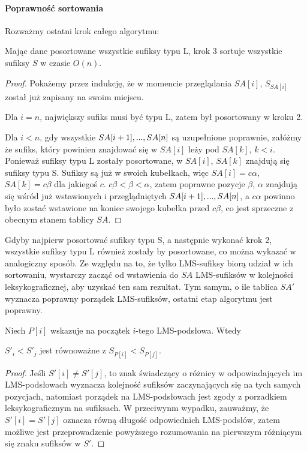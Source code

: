 \paragraph{Poprawność sortowania}

Rozważmy ostatni krok całego algorytmu:

\begin{lemma}{}{}
	Mając dane posortowane wszystkie sufiksy typu L, krok 3 sortuje wszystkie
	sufiksy $S$ w czasie $O(n)$.
\end{lemma}

\begin{proof}
Pokażemy przez indukcję, że w momencie przeglądania $SA[i]$, $S_{SA[i]}$
został już zapisany na swoim miejscu.

\item Dla $i = n$, największy sufiks musi być typu L, zatem był posortowany w
kroku 2.

\item Dla $i < n$, gdy wszystkie $SA[i+1], \elps, SA[n]$ są uzupełnione
poprawnie, załóżmy że sufiks, który powinien znajdować się w $SA[i]$ leży
pod $SA[k]$, $k < i$. Ponieważ sufiksy typu L zostały posortowane, w
$SA[i]$, $SA[k]$ znajdują się sufiksy typu S. Sufiksy są już w swoich
kubełkach, więc $SA[i] = c\alpha$, $SA[k] = c\beta$ dla jakiegoś $c$.
$c\beta < \beta < \alpha$, zatem poprawne pozycje $\beta$, $\alpha$
znajdują się wśród już wstawionych i przeglądniętych $SA[i+1], \elps,
SA[n]$, a $c\alpha$ powinno było zostać wstawione na koniec swojego kubełka
przed $c\beta$, co jest sprzeczne z obecnym stanem tablicy $SA$.
\end{proof}

Gdyby najpierw posortować sufiksy typu S, a następnie wykonać krok 2, wszystkie
sufiksy typu L również zostały by posortowane, co można wykazać w analogiczny
sposób. Ze względu na to, że tylko LMS-sufiksy biorą udział w ich sortowaniu,
wystarczy zacząć od wstawienia do $SA$ LMS-sufiksów w kolejności
leksykograficznej, aby uzyskać ten sam rezultat. Tym samym, o ile tablica $SA'$
wyznacza poprawny porządek LMS-sufiksów, ostatni etap algorytmu jest poprawny.

Niech $P[i]$ wskazuje na początek $i$-tego LMS-podsłowa. Wtedy

\begin{lemma}{}{}
	$S'_i < S'_j$ jest równoważne z $S_{P[i]} < S_{P[j]}$.
\end{lemma}

\begin{proof}
	Jeśli $S'[i] \neq S'[j]$, to znak świadczący o różnicy w odpowiadających im
	LMS-podsłowach wyznacza kolejność sufiksów zaczynających się na tych samych
	pozycjach, natomiast porządek na LMS-podsłowach jest zgody z porzadkiem
	leksykograficznym na sufiksach. W przeciwynm wypadku, zauważmy, że $S'[i] =
	S'[j]$ oznacza równą długość odpowiednich LMS-podsłów, zatem
	możliwe jest przeprowadzenie powyższego rozumowania na pierwszym różniącym
	się znaku sufiksów w $S'$.
\end{proof}

